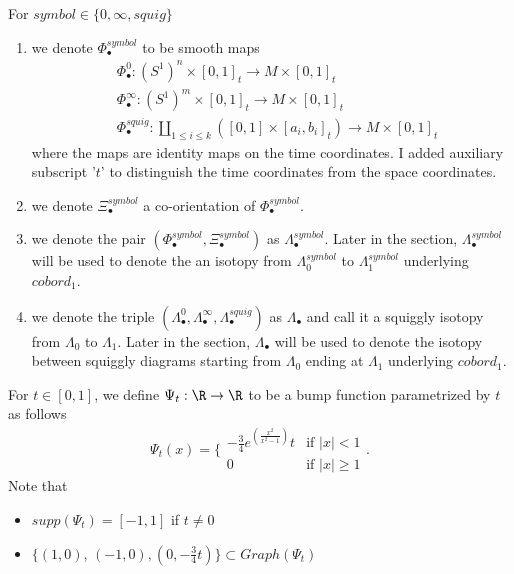 \begin{definition}
For $symbol\in\{0,\infty, squig \}$
\begin{enumerate}
\item we denote $\Phi_\bullet^{symbol}$ to be smooth maps
\begin{align*}
&\Phi_\bullet^0 : (S^1)^n \times [0,1]_t \rightarrow M \times [0,1]_t \\
&\Phi_\bullet^\infty : (S^1)^m \times [0,1]_t \rightarrow M \times [0,1]_t \\
&\Phi_\bullet^{squig} : \coprod_{1\leq i \leq k} ([0,1] \times [a_i,b_i]_t) \rightarrow M \times [0,1]_t
\end{align*}
where the maps are identity maps on the time coordinates. I added auxiliary subscript '$t$' to distinguish the time coordinates from the space coordinates.

\item we denote $\Xi_\bullet^{symbol}$ a co-orientation of $\Phi_\bullet^{symbol}$.

\item we denote the pair $(\Phi_\bullet^{symbol},\Xi_\bullet^{symbol})$ as $\Lambda_\bullet^{symbol}$. Later in the section, $\Lambda_\bullet^{symbol}$ will be used to denote the an isotopy from $\Lambda_0^{symbol}$ to $\Lambda_1^{symbol}$ underlying $cobord_1$.

\item we denote the triple $(\Lambda_\bullet^{0},\Lambda_\bullet^{\infty},\Lambda_\bullet^{squig})$ as $\Lambda_\bullet$ and call it a squiggly isotopy from $\Lambda_0$ to $\Lambda_1$. Later in the section, $\Lambda_\bullet$ will be used to denote the isotopy between squiggly diagrams starting from $\Lambda_0$ ending at $\Lambda_1$ underlying $cobord_1$.
\end{enumerate}
\end{definition}

\begin{definition}
For $t \in [0,1]$, we define $\Psi_t: \R \rightarrow \R$ to be a bump function parametrized by $t$ as follows
\[\Psi_t(x)=\bigg\{
\begin{array}{ll}
    -\frac{3}{4}e^{(\frac{x^2}{x^2 - 1})}t & \text{if } |x| < 1 \\
    0 & \text{if } |x| \geq 1
\end{array}
\bigg.
\]
Note that 
\begin{itemize}
\item $supp(\Psi_t) = [-1,1]$ if $t\neq 0$

\item $\{(1,0)$, $(-1,0),(0, -\frac{3}{4}t)\} \subset Graph(\Psi_t)$
\end{itemize}
\end{definition}


